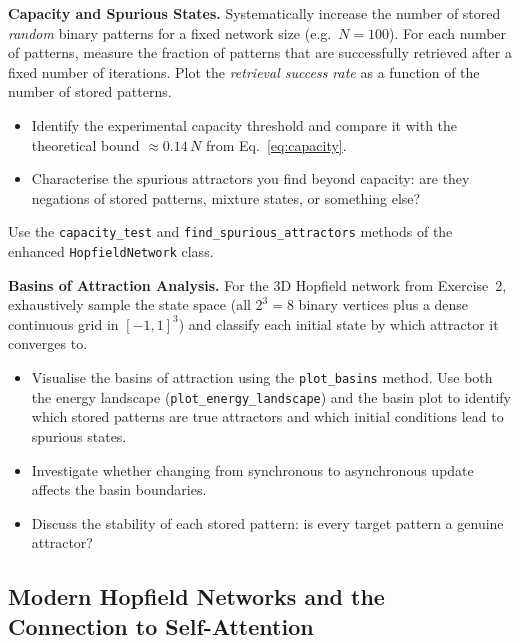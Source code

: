 \begin{questions}
    \item \textbf{Capacity and Spurious States.}\;
    Systematically increase the number of stored \emph{random} binary patterns for a fixed network size (e.g.\ $N{=}100$).
    For each number of patterns, measure the fraction of patterns that are successfully retrieved after a fixed number of iterations.
    Plot the \emph{retrieval success rate} as a function of the number of stored patterns.
    \begin{itemize}
        \item Identify the experimental capacity threshold and compare it with the theoretical bound $\approx 0.14\,N$ from Eq.~\eqref{eq:capacity}.
        \item Characterise the spurious attractors you find beyond capacity: are they negations of stored patterns, mixture states, or something else?
    \end{itemize}
    Use the \texttt{capacity\_test} and \texttt{find\_spurious\_attractors} methods of the enhanced \texttt{HopfieldNetwork} class.

    \item \textbf{Basins of Attraction Analysis.}\;
    For the 3D Hopfield network from Exercise~2, exhaustively sample the state space (all $2^3 = 8$ binary vertices plus a dense continuous grid in $[-1,1]^3$) and classify each initial state by which attractor it converges to.
    \begin{itemize}
        \item Visualise the basins of attraction using the \texttt{plot\_basins} method.
              Use both the energy landscape (\texttt{plot\_energy\_landscape}) and the basin plot to identify which stored patterns are true attractors and which initial conditions lead to spurious states.
        \item Investigate whether changing from synchronous to asynchronous update affects the basin boundaries.
        \item Discuss the stability of each stored pattern: is every target pattern a genuine attractor?
    \end{itemize}
\end{questions}

\subsection*{Modern Hopfield Networks and the Connection to Self-Attention}

